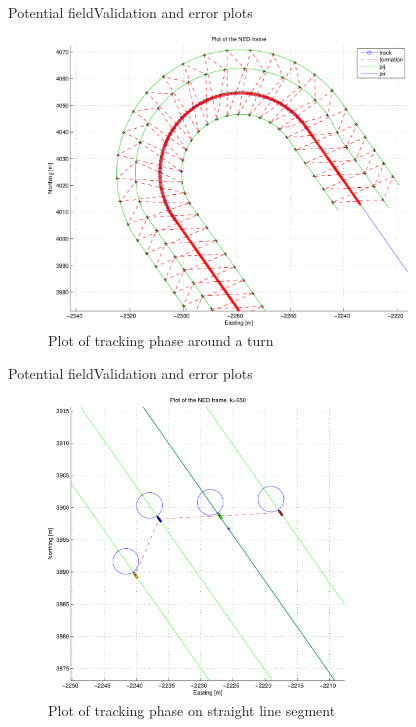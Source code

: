 \documentclass[10pt,handout]{beamer}
\begin{document}
\begin{frame}{Potential field}{Validation and error plots}
  \begin{figure}
    \includegraphics[width=0.85\textwidth]{img/pdftotalligeplussving}
    \caption{Plot of tracking phase around a turn}
  \end{figure}
\end{frame}

\begin{frame}{Potential field}{Validation and error plots}
  \begin{figure}
    \includegraphics[width=0.7\textwidth]{img/pdfligestykke}
    \caption{Plot of tracking phase on straight line segment}
  \end{figure}
\end{frame}
\end{document}
